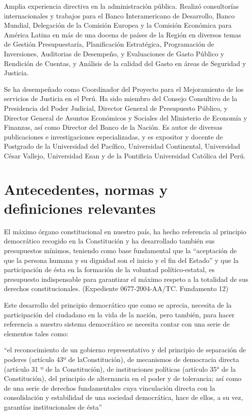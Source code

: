 \documentclass[
]{book}
\begin{document}
Amplia experiencia directiva en la administración pública. Realizó consultorías internacionales y trabajos para el Banco Interamericano de Desarrollo, Banco Mundial, Delegación de la Comisión Europea y la Comisión Económica para América Latina en más de una docena de países de la Región en diversos temas de Gestión Presupuestaría, Planificación Estratégica, Programación de Inversiones, Auditorias de Desempeño, y Evaluaciones de Gasto Público y Rendición de Cuentas, y Análisis de la calidad del Gasto en áreas de Seguridad y Justicia.

Se ha desempeñado como Coordinador del Proyecto para el Mejoramiento de los servicios de Justicia en el Perú. Ha sido miembro del Consejo Consultivo de la Presidencia del Poder Judicial, Director General de Presupuesto Público, y Director General de Asuntos Económicos y Sociales del Ministerio de Economía y Finanzas, así como Director del Banco de la Nación. Es autor de diversas publicaciones e investigaciones especializadas, y es expositor y docente de Postgrado de la Universidad del Pacífico, Universidad Continental, Universidad César Vallejo, Universidad Esan y de la Pontificia Universidad Católica del Perú.

\hypertarget{antecedentes-normas-y-definiciones-relevantes}{%
\chapter{Antecedentes, normas y definiciones relevantes}\label{antecedentes-normas-y-definiciones-relevantes}}

El máximo órgano constitucional en nuestro país, ha hecho referencia al principio democrático recogido en la Constitución y ha desarrollado también sus presupuestos mínimos, teniendo como base fundamental que la ``aceptación de que la persona humana y su dignidad son el inicio y el fin del Estado'' y que la participación de ésta en la formación de la voluntad político-estatal, es presupuesto indispensable para garantizar el máximo respeto a la totalidad de sus derechos constitucionales. (Expediente 0677-2004-AA/TC. Fundamento 12)

Este desarrollo del principio democrático que como se aprecia, necesita de la participación del ciudadano en la vida de la nación, pero también, para hacer referencia a nuestro sistema democrático se necesita contar con una serie de elementos tales como:

``el reconocimiento de un gobierno representativo y del principio de separación de poderes (artículo 43º de laConstitución), de mecanismos de democracia directa (artículo 31 º de la Constitución), de instituciones políticas (artículo 35° de la Constitución), del principio de alternancia en el poder y de tolerancia; así como de una serie de derechos fundamentales cuya
vinculación directa con la consolidación y estabilidad de una sociedad democrática,
hace de ellos, a su vez, garantías institucionales de ésta''
\end{document}
